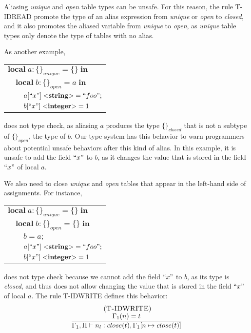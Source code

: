 Aliasing \emph{unique} and \emph{open} table types can be unsafe.
For this reason, the rule \textsc{T-IDREAD} promote the type of an
alias expression from \emph{unique} or \emph{open} to \emph{closed},
and it also promotes the aliased variable from
\emph{unique} to \emph{open}, as \emph{unique} table types only
denote the type of tables with no alias.

As another example,
\begin{center}
\begin{tabular}{lll}
\multicolumn{3}{l}{$\mathbf{local} \; a:\{\}_{unique} = \{\} \; \mathbf{in}$}\\
& \multicolumn{2}{l}{$\mathbf{local} \; b:\{\}_{open} = a \; \mathbf{in}$}\\
& & \multicolumn{1}{l}{$a[``x"] \; {<}\mathbf{string}{>} = ``foo";$}\\
& & \multicolumn{1}{l}{$b[``x"] \; {<}\mathbf{integer}{>} = 1$}\\
\end{tabular}
\end{center}
does not type check, as aliasing $a$ produces the type $\{\}_{closed}$
that is not a subtype of $\{\}_{open}$, the type of $b$.
Our type system has this behavior to warn programmers about
potential unsafe behaviors after this kind of alias.
In this example, it is unsafe to add the field $``x"$ to $b$,
as it changes the value that is stored in the field $``x"$ of local $a$.

We also need to close \emph{unique} and \emph{open} tables that
appear in the left-hand side of assignments.
For instance,
\begin{center}
\begin{tabular}{lll}
\multicolumn{3}{l}{$\mathbf{local} \; a:\{\}_{unique} = \{\} \; \mathbf{in}$}\\
& \multicolumn{2}{l}{$\mathbf{local} \; b:\{\}_{open} = \{\} \; \mathbf{in}$}\\
& & \multicolumn{1}{l}{$b = a;$}\\
& & \multicolumn{1}{l}{$a[``x"] \; {<}\mathbf{string}{>} = ``foo";$}\\
& & \multicolumn{1}{l}{$b[``x"] \; {<}\mathbf{integer}{>} = 1$}\\
\end{tabular}
\end{center}
does not type check because we cannot add the field $``x"$ to $b$,
as its type is \emph{closed}, and thus does not allow changing the
value that is stored in the field $``x"$ of local $a$.
The rule \textsc{T-IDWRITE} defines this behavior:
\[
\begin{array}{c}
\; (\textsc{T-IDWRITE})\\
\dfrac{\Gamma_{1}(n) = t}
      {\Gamma_{1}, \Pi \vdash n_{l}:close(t), \Gamma_{1}[n \mapsto close(t)]}
\end{array}
\]

